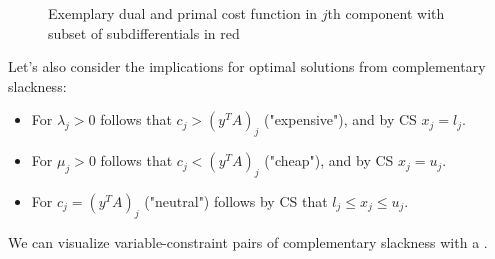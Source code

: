 \begin{figure*}
    \caption{Exemplary dual and primal cost function in $j$th component with subset of subdifferentials in red}
\end{figure*}
Let's also consider the implications for optimal solutions from complementary slackness:
\begin{itemize}
    \item For $\lambda_j > 0$ follows that $c_j > (y^TA)_j$ ("expensive"), and by CS $x_j=l_j$.
    \item For $\mu_j > 0$ follows that $c_j < (y^TA)_j$ ("cheap"), and by CS $x_j=u_j$.
    \item For $c_j = (y^TA)_j$ ("neutral") follows by CS that $l_j\leq x_j\leq u_j$.
\end{itemize}
\begin{definition}
    We can visualize variable-constraint pairs of complementary slackness with a .
\end{definition}
